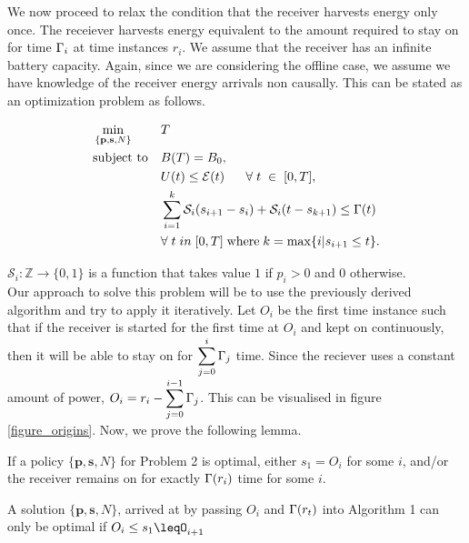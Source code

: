 
We now proceed to relax the condition that the receiver harvests energy only once. The receiever harvests energy equivalent to the amount required to stay on for time $\Gamma_i$ at time instances $r_i$. 
We assume that the receiver has an infinite battery capacity. 
Again, since we are considering the offline case, we assume we have knowledge of the receiver energy arrivals non causally. This can be stated as an optimization problem as follows.\\
\begin{problem}
\begin{align}
&\min_{\{\textbf{p},\textbf{s},N\}}			&& T
\\
&\text{subject to} 				&& B(T)=B_0, 
\label{pb2_constraint_bits}
\\
&     										&& U(t)\le \mathcal{E}(t)  		\;\;\;\;\;\; \forall \; t\;\in\;[0,T], \label{pb2_constraint_energy}
\\
&    										&& \displaystyle \sum_{i=1}^k \mathcal{S}_i(s_{i+1} - s_i) + \mathcal{S}_i(t - s_{k+1}) \leq \TRx(t) \\ &&&\forall \; t \; in \; [0,T] \; \text{where} \; k = \max\{i| s_{i+1} \leq t\}.
\label{pb2_constraint_time}
\end{align}
\end{problem}
$\mathcal{S}_i:\mathbb{Z}\rightarrow\{0,1\}$ is a function that takes value $1$ if $p_i>0$ and $0$ otherwise.\\
Our approach to solve this problem will be to use the previously derived algorithm and try to apply it iteratively. Let $O_i$ be the first time instance such that if the receiver is started for the first time at $O_i$ and kept on continuously, then it will be able to stay on for $\displaystyle \sum_{j=0}^i\Gamma_j$ time. Since the reciever uses a constant amount of power, $O_i = r_i - \displaystyle \sum_{j=0}^{i-1}\Gamma_j$. This can be visualised in figure \ref{figure_origins}. Now, we prove the following lemma.\\
\begin{lemma}
If a policy $\{\bm{p},\bm{s},N\}$ for Problem 2 is optimal, either $s_1 = O_i$ for some $i$, and/or the receiver remains on for exactly $\Gamma(r_i)$ time for some $i$.
\label{lemma_startpoints}
\end{lemma}

\begin{lemma}
A solution $\{\bm{p},\bm{s},N\}$, arrived at by passing $O_i$ and $\Gamma(r_t)$ into Algorithm 1 can only be optimal if $O_i\leq s_1\leqO_{i+1}$ 
\label{lemma_startpoints}
\end{lemma}

